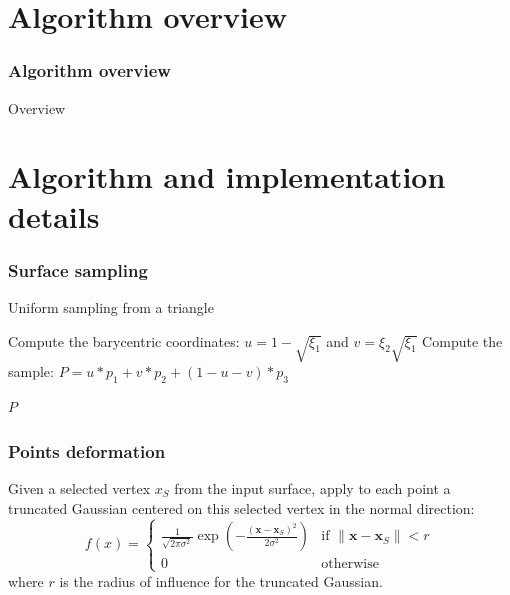 \documentclass{beamer}
\def\x{\mathbf{x}}
\begin{document}
\section{Algorithm overview}
\begin{frame}
	\frametitle{Algorithm overview}

\begin{algorithm}[H]
\caption{Overview}
\begin{algorithmic}
\end{algorithmic}
\end{algorithm}

\end{frame}


\section{Algorithm and implementation details}

\begin{frame}
\frametitle{Surface sampling}

\begin{algorithm}[H]
\caption{Uniform sampling from a triangle}
\label{alg:sample}
\begin{algorithmic}


\State Compute the barycentric coordinates: $u = 1-\sqrt{\xi_1}$ 
and $v = \xi_2 \sqrt{\xi_1}$
\State Compute the sample: $P = u * p_1 + v * p_2 + (1 - u - v) * p_3$

\Return $P$
\EndFunction
\end{algorithmic}
\end{algorithm}

\end{frame}


\begin{frame}
	\frametitle{Points deformation}
	\Large
		Given a selected vertex $x_S$ from the input surface, 
		apply to each point a truncated Gaussian centered on this selected vertex
		in the normal direction:
\[f(x)=
\begin{cases}
 \frac{1}{\sqrt{2\pi \sigma^2}} \exp \left(- \frac{(\x- \x_S)^{2}}{2 \sigma^{2}}\right) & \text{if } \|\x-\x_S\| < r \\
0 & \text{otherwise}
\end{cases}
\]
where $r$ is the radius of influence for the truncated Gaussian.

\end{frame}
\end{document}

